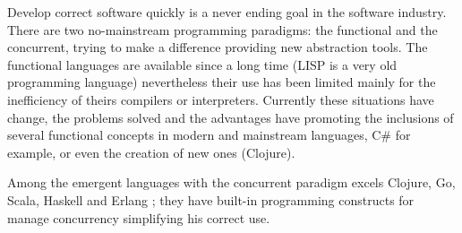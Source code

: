 
Develop correct software quickly is a never ending goal in the software industry. There are two no-mainstream programming paradigms: the functional and the concurrent, trying to make a difference providing new abstraction tools. The functional languages are available since a long time (LISP is a very old programming language) nevertheless their use has been limited mainly for the inefficiency of theirs compilers or interpreters. Currently these situations have change, the problems solved and the advantages have promoting the inclusions of several functional concepts in modern and mainstream languages, C\# for example, or even the creation of new ones (Clojure).

Among the emergent languages with the concurrent paradigm excels Clojure, Go, Scala, Haskell and Erlang \cite{Nov.-Dec.2012}; they have built-in programming constructs for manage concurrency simplifying his correct use. 